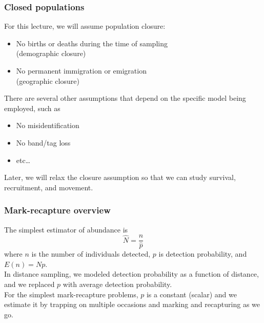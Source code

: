 \documentclass[color=usenames,dvipsnames]{beamer}\usepackage[]{graphicx}\usepackage[]{xcolor}
\begin{document}
\begin{frame}
  \frametitle{Closed populations}
  For this lecture, we will assume population closure:
  \begin{itemize}
    \item No births or deaths during the time of sampling \\ (demographic
      closure)
    \item No permanent immigration or emigration \\ (geographic closure)
  \end{itemize}
  \pause
  \vfill
  There are several other assumptions that depend on the specific
  model being employed, such as
  \begin{itemize}
    \item No misidentification
    \item No band/tag loss
    \item etc\dots
  \end{itemize}
  \pause
  \vfill
  Later, we will relax the closure assumption so that we can study
  survival, recruitment, and movement.
\end{frame}



\begin{frame}
  \frametitle{Mark-recapture overview}
  The simplest estimator of abundance is 
  \[
    \hat{N} = \frac{n}{\hat{p}}
  \]
  where $n$ is the number of individuals detected, $p$ is detection
  probability, and $E(n)=Np$. \\
  \pause
  \vfill
  In distance sampling, we modeled detection probability as a
  function of distance, and we replaced $p$ with average detection
  probability. \\ 
  \pause
  \vfill
  For the simplest mark-recapture problems, $p$ is a constant (scalar) and we
  estimate it by trapping on multiple occasions and marking and
  recapturing as we go.  
\end{frame}
\end{document}
